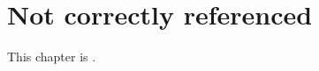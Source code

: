 \documentclass{grattan}
\begin{document}
\chapter{Not correctly referenced}\label{chap:not-correct-refd}
This chapter is .
\end{document}
